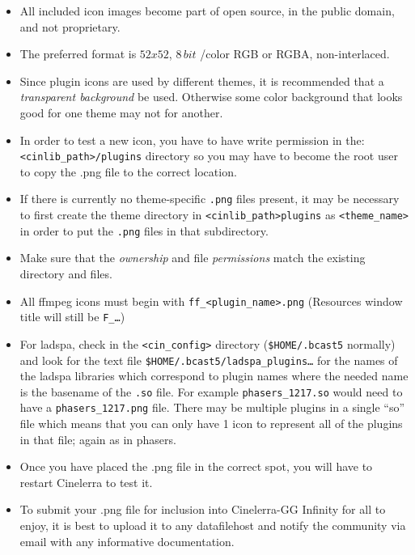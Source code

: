 \begin{itemize}
    \item All included icon images become part of open source, in the public domain, and not proprietary.
    \item The preferred format is $52 x 52$, $8\,bit$ /color RGB or RGBA, non-interlaced.
    \item Since plugin icons are used by different themes, it is recommended that a \textit{transparent background} be used. Otherwise some color background that looks good for one theme may not for another.
    \item In order to test a new icon, you have to have write permission in the: \\ 
    \texttt{<cinlib\_path>/plugins} directory so you may have to become the root user to copy the .png file to the correct location.
    \item If there is currently no theme-specific \texttt{.png} files present, it may be necessary to first create the theme directory in \texttt{<cinlib\_path>plugins} as \texttt{<theme\_name>} in order to put the \texttt{.png} files in that subdirectory.
    \item Make sure that the \textit{ownership} and file \textit{permissions} match the existing directory and files.
    \item All ffmpeg icons must begin with \texttt{ff\_<plugin\_name>.png} (Resources window title will still be \texttt{F\_\dots})
    \item For ladspa, check in the \texttt{<cin\_config>} directory (\texttt{\$HOME/.bcast5} normally) and look for the text file \texttt{\$HOME/.bcast5/ladspa\_plugins\dots} for the names of the ladspa libraries which correspond to plugin names where the needed name is the basename of the \texttt{.so} file. For example \texttt{phasers\_1217.so} would need to have a \texttt{phasers\_1217.png} file. There may be multiple plugins in a single “so” file which means that you can only have 1 icon to represent all of the plugins in that file; again as in phasers.
    \item Once you have placed the .png file in the correct spot, you will have to restart Cinelerra to test it.
    \item To submit your .png file for inclusion into Cinelerra-GG Infinity for all to enjoy, it is best to upload it to any datafilehost and notify the community via email with any informative documentation.
\end{itemize}

